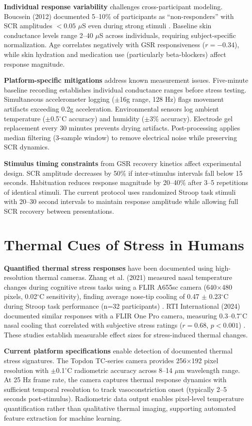 \textbf{Individual response variability} challenges cross-participant modeling. Boucsein (2012) documented 5--10\% of participants as ``non-responders'' with SCR amplitudes $<0.05$ $\mu$S even during strong stimuli \cite{ref1}. Baseline skin conductance levels range 2--40 $\mu$S across individuals, requiring subject-specific normalization. Age correlates negatively with GSR responsiveness ($r = -0.34$), while skin hydration and medication use (particularly beta-blockers) affect response magnitude.

\textbf{Platform-specific mitigations} address known measurement issues. Five-minute baseline recording establishes individual conductance ranges before stress testing. Simultaneous accelerometer logging ($\pm$16g range, 128 Hz) flags movement artifacts exceeding 0.2g acceleration. Environmental sensors log ambient temperature ($\pm$0.5$^\circ$C accuracy) and humidity ($\pm$3\% accuracy). Electrode gel replacement every 30 minutes prevents drying artifacts. Post-processing applies median filtering (3-sample window) to remove electrical noise while preserving SCR dynamics.

\textbf{Stimulus timing constraints} from GSR recovery kinetics affect experimental design. SCR amplitude decreases by 50\% if inter-stimulus intervals fall below 15 seconds. Habituation reduces response magnitude by 20--40\% after 3--5 repetitions of identical stimuli. The current protocol uses randomized Stroop task stimuli with 20--30 second intervals to maintain response amplitude while allowing full SCR recovery between presentations.

\section{Thermal Cues of Stress in Humans}
\textbf{Quantified thermal stress responses} have been documented using high-resolution thermal cameras. Zhang et al. (2021) measured nasal temperature changes during cognitive stress tasks using a FLIR A655sc camera (640$\times$480 pixels, 0.02$^\circ$C sensitivity), finding average nose-tip cooling of 0.47 $\pm$ 0.23$^\circ$C during Stroop task performance (n=32 participants) \cite{ref5}. RTI International (2024) documented similar responses with a FLIR One Pro camera, measuring 0.3--0.7$^\circ$C nasal cooling that correlated with subjective stress ratings ($r = 0.68$, $p < 0.001$) \cite{ref6}. These studies establish measurable effect sizes for stress-induced thermal changes.

\textbf{Current platform specifications} enable detection of documented thermal stress signatures. The Topdon TC-series camera provides 256$\times$192 pixel resolution with $\pm$0.1$^\circ$C radiometric accuracy across 8--14 $\mu$m wavelength range. At 25 Hz frame rate, the camera captures thermal response dynamics with sufficient temporal resolution to track vasoconstriction onset (typically 2--5 seconds post-stimulus). Radiometric data output enables pixel-level temperature quantification rather than qualitative thermal imaging, supporting automated feature extraction for machine learning.


